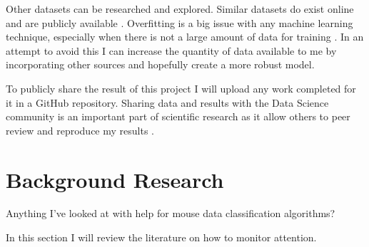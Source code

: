 \documentclass{article}
\begin{document}
Other datasets can be researched and explored.
Similar datasets do exist online and are publicly available \cite{kaggleWorkerActivity}.
Overfitting is a big issue with any machine learning technique, especially when there is not a large amount of data for training \cite{dietterich1995overfitting}.
In an attempt to avoid this I can increase the quantity of data available to me by incorporating other sources and hopefully create a more robust model.



To publicly share the result of this project I will upload any work completed for it in a GitHub repository.
Sharing data and results with the Data Science community is an important part of scientific research as it allow others to peer review and reproduce my results \cite{Birnholtz2003data}.



\section{Background Research}
Anything I've looked at with help for mouse data classification algorithms? 

In this section I will review the literature on how to monitor attention.


\end{document}
